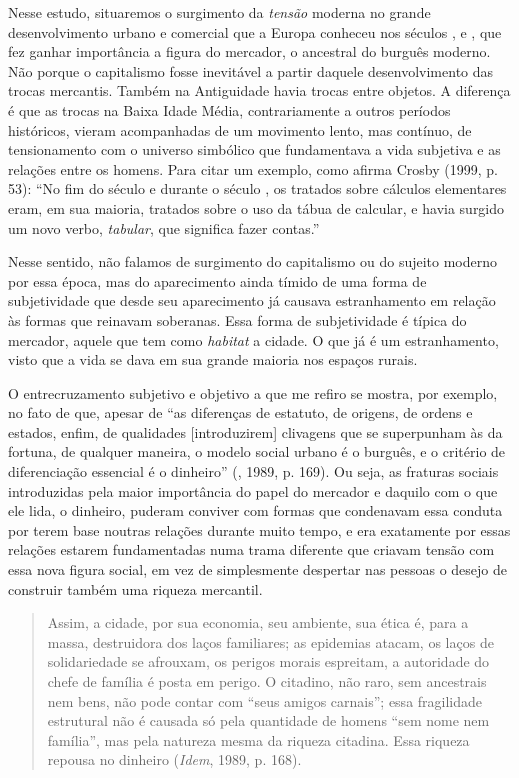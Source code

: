 Nesse estudo, situaremos o surgimento da \emph{tensão} moderna no grande
desenvolvimento urbano e comercial que a Europa conheceu nos séculos ,
 e , que fez ganhar importância a figura do mercador,
o ancestral do burguês moderno. Não porque o capitalismo fosse
inevitável a partir daquele desenvolvimento das trocas mercantis. Também
na Antiguidade havia trocas entre objetos. A diferença é que as trocas
na Baixa Idade Média, contrariamente a outros períodos
históricos, vieram acompanhadas de um movimento lento, mas contínuo, de
tensionamento com o universo simbólico que fundamentava a vida subjetiva
e as relações entre os homens. Para citar um exemplo, como afirma Crosby
(1999, p. 53): ``No fim do século  e durante o século , os tratados sobre cálculos elementares eram, em sua maioria, tratados sobre o uso da
tábua de calcular, e havia surgido um novo verbo, \emph{tabular}, que
significa fazer contas.''

Nesse sentido, não falamos de surgimento do capitalismo ou do sujeito
moderno por essa época, mas do aparecimento ainda tímido de uma forma de
subjetividade que desde seu aparecimento já causava estranhamento em
relação às formas que reinavam soberanas. Essa forma de subjetividade é
típica do mercador, aquele que tem como \emph{habitat} a cidade.
O que já é um estranhamento, visto que a vida se dava em sua grande
maioria nos espaços rurais.

O entrecruzamento subjetivo e objetivo a que me refiro se mostra, por
exemplo, no fato de que, apesar de ``as diferenças de estatuto, de
origens, de ordens e estados, enfim, de qualidades [introduzirem]
clivagens que se superpunham às da fortuna, de qualquer maneira, o
modelo social urbano é o burguês, e o critério de diferenciação
essencial é o dinheiro'' (, 1989, p. 169). Ou
seja, as fraturas sociais introduzidas pela maior importância do papel
do mercador e daquilo com o que ele lida, o dinheiro, puderam conviver
com formas que condenavam essa conduta por terem base noutras relações
durante muito tempo, e era exatamente por essas relações estarem
fundamentadas numa trama diferente que criavam tensão com essa nova
figura social, em vez de simplesmente despertar nas pessoas o desejo de
construir também uma riqueza mercantil.

\begin{quote}
Assim, a cidade, por sua economia, seu ambiente, sua ética é, para a
massa, destruidora dos laços familiares; as epidemias atacam, os laços
de solidariedade se afrouxam, os perigos morais espreitam, a autoridade
do chefe de família é posta em perigo. O citadino, não raro, sem
ancestrais nem bens, não pode contar com ``seus amigos carnais''; essa
fragilidade estrutural não é causada só pela quantidade de homens ``sem
nome nem família'', mas pela natureza mesma da riqueza citadina. Essa
riqueza repousa no dinheiro (\emph{Idem}, 1989, p. 168).
\end{quote}

